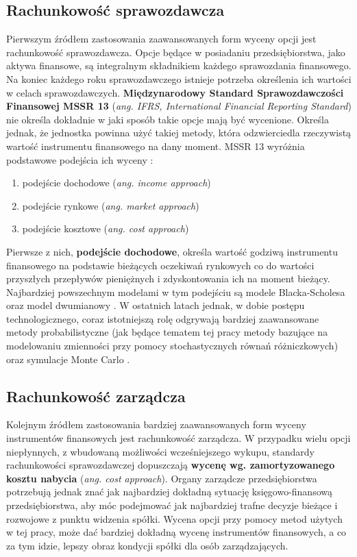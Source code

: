 \documentclass{pracamgr}
\begin{document}
\subsection{Rachunkowość sprawozdawcza} %
\label{sub:rachunkowosc_sprawozdawcza}
Pierwszym źródłem zastosowania zaawansowanych form wyceny opcji jest rachunkowość sprawozdawcza.
Opcje będące w posiadaniu przedsiębiorstwa, jako aktywa finansowe, są integralnym składnikiem każdego sprawozdania finansowego. Na koniec 
każdego roku sprawozdawczego istnieje potrzeba określenia ich wartości w celach sprawozdawczych.
\textbf{Międzynarodowy Standard Sprawozdawczości Finansowej MSSR 13} (\textit{ang. IFRS, International Financial Reporting Standard}) 
nie określa dokładnie w jaki sposób takie opcje mają być wycenione. 
Określa jednak, że jednostka powinna użyć takiej metody, która odzwierciedla
rzeczywistą  wartość instrumentu finansowego na dany moment. MSSR 13 wyróżnia podstawowe podejścia ich wyceny \cite{IFRS2013}:
\begin{enumerate}
  \item podejście dochodowe (\textit{ang. income approach})
  \item podejście rynkowe (\textit{ang. market approach})
  \item podejście kosztowe (\textit{ang. cost approach})
\end{enumerate}
Pierwsze z nich, \textbf{podejście dochodowe}, określa wartość godziwą instrumentu finansowego na podstawie bieżących oczekiwań rynkowych co do wartości 
przyszłych przepływów pieniężnych i zdyskontowania ich na moment bieżący. Najbardziej powszechnym modelami w tym podejściu są modele Blacka-Scholesa 
oraz model dwumianowy \cite{IFRS2013}. W ostatnich latach jednak, w dobie postępu technologicznego, coraz istotniejszą rolę odgrywają bardziej zaawansowane metody probabilistyczne
(jak będące tematem tej pracy metody bazujące na modelowaniu zmienności przy pomocy stochastycznych równań różniczkowych) oraz symulacje Monte Carlo \cite{FairValue2010}.  


\subsection{Rachunkowość zarządcza} %
\label{sub:RachunkowoscZarzadcza}
Kolejnym źródłem zastosowania bardziej zaawansowanych form wyceny instrumentów finansowych jest rachunkowość zarządcza. 
W przypadku wielu opcji niepłynnych, z wbudowaną możliwości wcześniejszego wykupu, standardy rachunkowości sprawozdawczej dopuszczają
\textbf{wycenę wg. zamortyzowanego kosztu nabycia} (\textit{ang. cost approach}). Organy zarządcze 
przedsiębiorstwa potrzebują jednak znać jak najbardziej dokładną sytuację księgowo-finansową przedsiębiorstwa, aby móc podejmować
jak najbardziej trafne decyzje bieżące i rozwojowe z punktu widzenia spółki. 
Wycena opcji przy pomocy metod użytych w tej pracy, może dać bardziej dokładną wycenę instrumentów 
finansowych, a co za tym idzie, lepszy obraz kondycji spółki dla osób zarządzających.  
\end{document}
